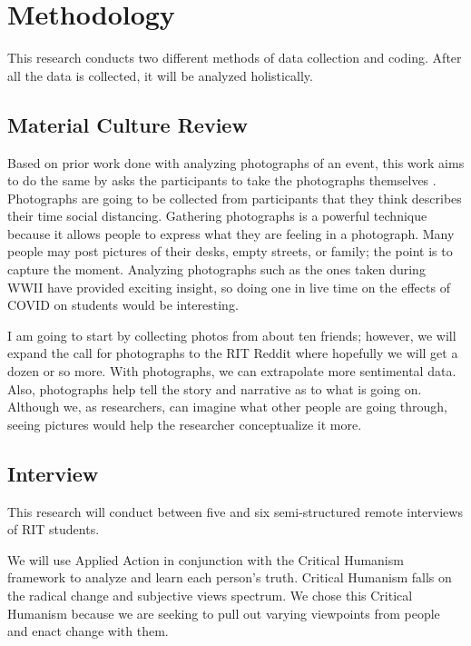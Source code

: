 \documentclass[12pt]{apa6}
\begin{document}
\section{Methodology}

This research conducts two different methods of data collection and coding. After all the data is collected, it will be analyzed holistically. 

\subsection{Material Culture Review}

Based on prior work done with analyzing photographs of an event, this work aims to do the same by asks the participants to take the photographs themselves \cite{photographyMaterialCulture}. 
Photographs are going to be collected from participants that they think describes their time social distancing. Gathering photographs is a powerful technique because it allows people to express what they are feeling in a photograph. Many people may post pictures of their desks, empty streets, or family; the point is to capture the moment.
Analyzing photographs such as the ones taken during WWII\cite{wwII} have provided exciting insight, so doing one in live time on the effects of COVID on students would be interesting. 

I am going to start by collecting photos from about ten friends; however, we will expand the call for photographs to the RIT Reddit where hopefully we will get a dozen or so more. With photographs, we can extrapolate more sentimental data. Also, photographs help tell the story and narrative as to what is going on. Although we, as researchers, can imagine what other people are going through, seeing pictures would help the researcher conceptualize it more.

\subsection{Interview}

This research will conduct between five and six semi-structured remote interviews of RIT students. 

We will use Applied Action in conjunction with the Critical Humanism framework to analyze and learn each person's truth. 
Critical Humanism falls on the radical change and subjective views spectrum. 
We chose this Critical Humanism because we are seeking to pull out varying viewpoints from people and enact change with them.
\end{document}
